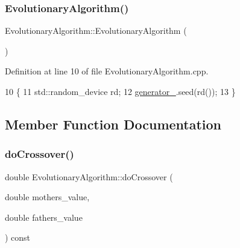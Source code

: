 \mbox{\label{classEvolutionaryAlgorithm_a7a37fb1cdb3f585529af74dec4d0bf8d}} 
\subsubsection{\texorpdfstring{Evolutionary\+Algorithm()}{EvolutionaryAlgorithm()}\hspace{0.1cm}{\footnotesize\ttfamily [2/2]}}
{\footnotesize\ttfamily Evolutionary\+Algorithm\+::\+Evolutionary\+Algorithm (\begin{DoxyParamCaption}{ }\end{DoxyParamCaption})\hspace{0.3cm}{\ttfamily [private]}}



Definition at line 10 of file Evolutionary\+Algorithm.\+cpp.


\begin{DoxyCode}
10                                              \{
11     std::random\_device rd;
12     \hyperlink{classEvolutionaryAlgorithm_adbd823d385ad95bf20496fd2fc25ccde}{generator\_}.seed(rd());
13 \}
\end{DoxyCode}


\subsection{Member Function Documentation}
\mbox{\label{classEvolutionaryAlgorithm_a1f0c3d66b8abfdcdf6eedf065580cef6}} 
\subsubsection{\texorpdfstring{do\+Crossover()}{doCrossover()}\hspace{0.1cm}{\footnotesize\ttfamily [1/2]}}
{\footnotesize\ttfamily double Evolutionary\+Algorithm\+::do\+Crossover (\begin{DoxyParamCaption}\item[{double}]{mothers\+\_\+value,  }\item[{double}]{fathers\+\_\+value }\end{DoxyParamCaption}) const\hspace{0.3cm}{\ttfamily [private]}}



